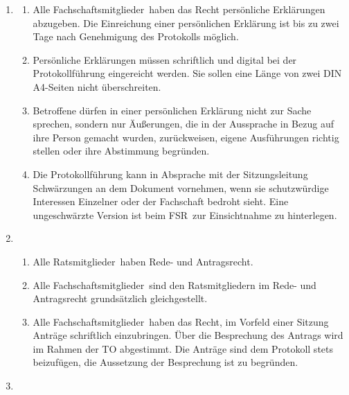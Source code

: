 \documentclass[a4paper, 12pt, ngerman]{article}
\newcommand{\rat}{FSR}
\newcommand{\mitglieder}{Ratsmitglieder}
\newcommand{\fsmitglieder}{Fachschaftsmitglieder}
\begin{document}
\begin{enumerate}[leftmargin=0cm]
	\item {}\label{pers.erkl}
	
	\begin{enumerate}[leftmargin=0cm]
		\item Alle \fsmitglieder~haben das Recht persönliche Erklärungen abzugeben. Die Einreichung einer persönlichen Erklärung ist bis zu zwei Tage nach Genehmigung des Protokolls möglich.
		\item Persönliche Erklärungen müssen schriftlich und digital bei der Protokollführung
		eingereicht werden. Sie sollen eine Länge von zwei DIN A4-Seiten nicht überschreiten.
		\item Betroffene dürfen in einer persönlichen Erklärung nicht zur Sache sprechen, sondern nur
		Äußerungen, die in der Aussprache in Bezug auf ihre Person
		gemacht wurden, zurückweisen, eigene Ausführungen richtig
		stellen oder ihre Abstimmung begründen.
		\item Die Protokollführung kann in Absprache mit der Sitzungsleitung Schwärzungen an dem Dokument vornehmen, wenn sie schutzwürdige Interessen Einzelner oder der Fachschaft bedroht sieht. Eine ungeschwärzte Version ist beim \rat~zur Einsichtnahme zu hinterlegen.
	\end{enumerate}
	
	
	\item {}
	
	\begin{enumerate}[leftmargin=0cm]
		\item Alle \mitglieder~haben Rede- und Antragsrecht.
		\item Alle \fsmitglieder~sind den Ratsmitgliedern im Rede- und Antragsrecht grundsätzlich gleichgestellt.
		\label{antragsrecht-fsmitglieder}
		\item Alle \fsmitglieder~haben das Recht, im Vorfeld einer Sitzung Anträge schriftlich einzubringen. Über die Besprechung des Antrags wird im Rahmen der TO abgestimmt. Die Anträge sind dem Protokoll stets beizufügen, die Aussetzung der Besprechung ist zu begründen.
	\end{enumerate}
	
	\item {}\label{redeordnung}
	

\end{enumerate}
\end{document}

